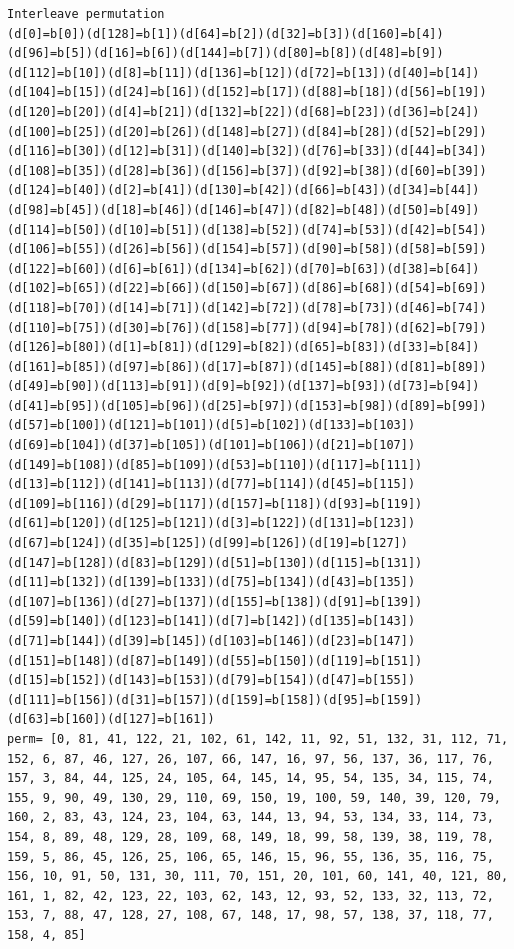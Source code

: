 \begin{lstlisting}
Interleave permutation
(d[0]=b[0])(d[128]=b[1])(d[64]=b[2])(d[32]=b[3])(d[160]=b[4])(d[96]=b[5])(d[16]=b[6])(d[144]=b[7])(d[80]=b[8])(d[48]=b[9])(d[112]=b[10])(d[8]=b[11])(d[136]=b[12])(d[72]=b[13])(d[40]=b[14])(d[104]=b[15])(d[24]=b[16])(d[152]=b[17])(d[88]=b[18])(d[56]=b[19])(d[120]=b[20])(d[4]=b[21])(d[132]=b[22])(d[68]=b[23])(d[36]=b[24])(d[100]=b[25])(d[20]=b[26])(d[148]=b[27])(d[84]=b[28])(d[52]=b[29])(d[116]=b[30])(d[12]=b[31])(d[140]=b[32])(d[76]=b[33])(d[44]=b[34])(d[108]=b[35])(d[28]=b[36])(d[156]=b[37])(d[92]=b[38])(d[60]=b[39])(d[124]=b[40])(d[2]=b[41])(d[130]=b[42])(d[66]=b[43])(d[34]=b[44])(d[98]=b[45])(d[18]=b[46])(d[146]=b[47])(d[82]=b[48])(d[50]=b[49])(d[114]=b[50])(d[10]=b[51])(d[138]=b[52])(d[74]=b[53])(d[42]=b[54])(d[106]=b[55])(d[26]=b[56])(d[154]=b[57])(d[90]=b[58])(d[58]=b[59])(d[122]=b[60])(d[6]=b[61])(d[134]=b[62])(d[70]=b[63])(d[38]=b[64])(d[102]=b[65])(d[22]=b[66])(d[150]=b[67])(d[86]=b[68])(d[54]=b[69])(d[118]=b[70])(d[14]=b[71])(d[142]=b[72])(d[78]=b[73])(d[46]=b[74])(d[110]=b[75])(d[30]=b[76])(d[158]=b[77])(d[94]=b[78])(d[62]=b[79])(d[126]=b[80])(d[1]=b[81])(d[129]=b[82])(d[65]=b[83])(d[33]=b[84])(d[161]=b[85])(d[97]=b[86])(d[17]=b[87])(d[145]=b[88])(d[81]=b[89])(d[49]=b[90])(d[113]=b[91])(d[9]=b[92])(d[137]=b[93])(d[73]=b[94])(d[41]=b[95])(d[105]=b[96])(d[25]=b[97])(d[153]=b[98])(d[89]=b[99])(d[57]=b[100])(d[121]=b[101])(d[5]=b[102])(d[133]=b[103])(d[69]=b[104])(d[37]=b[105])(d[101]=b[106])(d[21]=b[107])(d[149]=b[108])(d[85]=b[109])(d[53]=b[110])(d[117]=b[111])(d[13]=b[112])(d[141]=b[113])(d[77]=b[114])(d[45]=b[115])(d[109]=b[116])(d[29]=b[117])(d[157]=b[118])(d[93]=b[119])(d[61]=b[120])(d[125]=b[121])(d[3]=b[122])(d[131]=b[123])(d[67]=b[124])(d[35]=b[125])(d[99]=b[126])(d[19]=b[127])(d[147]=b[128])(d[83]=b[129])(d[51]=b[130])(d[115]=b[131])(d[11]=b[132])(d[139]=b[133])(d[75]=b[134])(d[43]=b[135])(d[107]=b[136])(d[27]=b[137])(d[155]=b[138])(d[91]=b[139])(d[59]=b[140])(d[123]=b[141])(d[7]=b[142])(d[135]=b[143])(d[71]=b[144])(d[39]=b[145])(d[103]=b[146])(d[23]=b[147])(d[151]=b[148])(d[87]=b[149])(d[55]=b[150])(d[119]=b[151])(d[15]=b[152])(d[143]=b[153])(d[79]=b[154])(d[47]=b[155])(d[111]=b[156])(d[31]=b[157])(d[159]=b[158])(d[95]=b[159])(d[63]=b[160])(d[127]=b[161])
perm= [0, 81, 41, 122, 21, 102, 61, 142, 11, 92, 51, 132, 31, 112, 71, 152, 6, 87, 46, 127, 26, 107, 66, 147, 16, 97, 56, 137, 36, 117, 76, 157, 3, 84, 44, 125, 24, 105, 64, 145, 14, 95, 54, 135, 34, 115, 74, 155, 9, 90, 49, 130, 29, 110, 69, 150, 19, 100, 59, 140, 39, 120, 79, 160, 2, 83, 43, 124, 23, 104, 63, 144, 13, 94, 53, 134, 33, 114, 73, 154, 8, 89, 48, 129, 28, 109, 68, 149, 18, 99, 58, 139, 38, 119, 78, 159, 5, 86, 45, 126, 25, 106, 65, 146, 15, 96, 55, 136, 35, 116, 75, 156, 10, 91, 50, 131, 30, 111, 70, 151, 20, 101, 60, 141, 40, 121, 80, 161, 1, 82, 42, 123, 22, 103, 62, 143, 12, 93, 52, 133, 32, 113, 72, 153, 7, 88, 47, 128, 27, 108, 67, 148, 17, 98, 57, 138, 37, 118, 77, 158, 4, 85]
\end{lstlisting}

